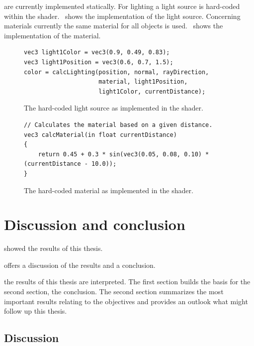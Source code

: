 \documentclass[%
    a4paper,    %
    justified,  %
    nobib,      %
    openany     %
]{tufte-book}
\makeatletter
\renewcommand{\label}[1]{\@tufte@label{##1}}%
\makeatother
\begin{document}
 are currently implemented statically. For
lighting a light source is hard-coded within the
shader.~ shows the implementation of the light
source. Concerning materials currently the same material for all objects is
used.~ shows the implementation of the
material.

\begin{figure}
  \begin{verbatim}
vec3 light1Color = vec3(0.9, 0.49, 0.83);
vec3 light1Position = vec3(0.6, 0.7, 1.5);
color = calcLighting(position, normal, rayDirection,
                     material, light1Position,
                     light1Color, currentDistance);
  \end{verbatim}
\caption{The hard-coded light source as implemented in the shader.}
\label{fig:lights-implementation}
\end{figure}

\begin{figure}
  \begin{verbatim}
// Calculates the material based on a given distance.
vec3 calcMaterial(in float currentDistance)
{
    return 0.45 + 0.3 * sin(vec3(0.05, 0.08, 0.10) * (currentDistance - 10.0));
}
  \end{verbatim}
\caption{The hard-coded material as implemented in the shader.}
\label{fig:material-implementation}
\end{figure}%

\chapter{Discussion and conclusion}
\label{chap:discussion-conclusion}

 showed the results of this thesis.

 offers a discussion of the results and a conclusion.

 the results of this thesis are interpreted.
The first section builds the basis for the second section, the conclusion. The
second section summarizes the most important results relating to the
objectives and provides an outlook what might follow up this thesis.


\section{Discussion}
\label{sec:discussion-conclusion:discussion}
\end{document}
